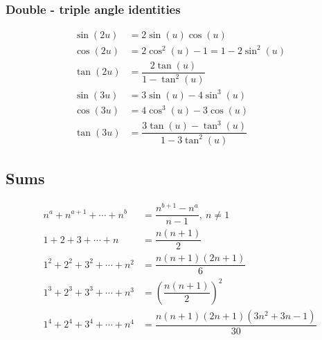 \subsubsection{Double - triple angle identities}
\vspace{-0.6cm}
\begin{align*}
\sin(2u) &= 2\sin(u)\cos(u) \\ 
\cos(2u) &= 2\cos^2(u) - 1 = 1 - 2\sin^2(u) \\
\tan(2u) &= \dfrac{2\tan(u)}{1-\tan^2(u)} \\ 
\sin(3u) &= 3\sin(u) - 4\sin^3(u) \\ 
\cos(3u) &= 4\cos^3(u) - 3\cos(u) \\ 
\tan(3u) &= \dfrac{3\tan(u) - \tan^3(u)}{1 - 3\tan^2(u)}
\end{align*}

\subsection{Sums}
\vspace{-0.6cm}
\begin{align*}
	n^{a} + n^{a + 1} + \cdots + n^{b} &= \dfrac{n^{b + 1} - n^{a}}{n - 1},\ n \neq 1 \\
	1 + 2 + 3 + \cdots + n &= \dfrac{n(n + 1)}{2} \\
	1^2 + 2^2 + 3^2 + \cdots + n^2 &= \dfrac{n(n + 1)(2n + 1)}{6} \\ 
	1^3 + 2^3 + 3^3 + \cdots + n^3 &= \left(\dfrac{n(n + 1)}{2}\right)^2 \\ 
	1^4 + 2^4 + 3^4 + \cdots + n^4 &= \dfrac{n(n + 1)(2n + 1)(3n^2 + 3n - 1)}{30}
\end{align*}